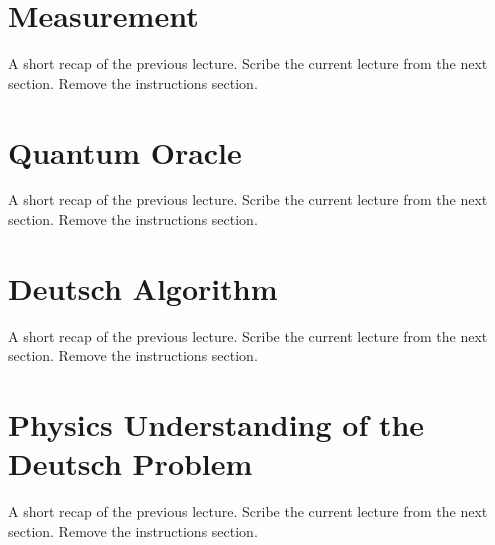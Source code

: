 \documentclass[11.5pt, paper=a4]{article}
\theoremstyle{definition}
\numberwithin{theorem}{section}
\begin{document}
\section{Measurement}

A short recap of the previous lecture. Scribe the current lecture from the next section. Remove the instructions section.

\section{Quantum Oracle}

A short recap of the previous lecture. Scribe the current lecture from the next section. Remove the instructions section.

\section{Deutsch Algorithm}

A short recap of the previous lecture. Scribe the current lecture from the next section. Remove the instructions section.

\section{Physics Understanding of the Deutsch Problem}

A short recap of the previous lecture. Scribe the current lecture from the next section. Remove the instructions section.

\nocite{*}


\end{document}
